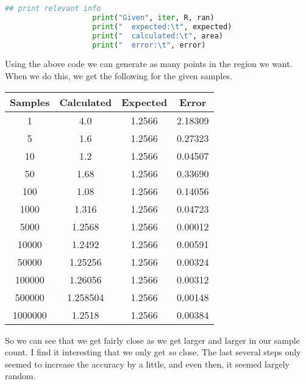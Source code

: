 \documentclass[11pt]{article}
\begin{document}
\begin{enumerate}
\begin{lstlisting}[style=mystyle, linewidth=0.94\linewidth, 
                                language=Python, gobble=12, caption=Monte Carlo
                                Rejection Sampling for Area of Circle]
                    ## print relevant info
                    print("Given", iter, R, ran)
                    print("  expected:\t", expected)
                    print("  calculated:\t", area)
                    print("  error:\t", error)
            \end{lstlisting}
            Using the above code we can generate as many points in the region
            we want. When we do this, we get the following for the given
            samples.
            \begin{center}
                \begin{tabular}{|| c || c | c | c ||}
                    \hline
                    Samples &   Calculated  &   Expected    &   Error   \\
                    \hline
                    \hline
                    1 	    &	 4.0 	    &	 1.2566 	&	 2.18309    \\
                    5 	    &	 1.6 	    &	 1.2566 	&	 0.27323    \\
                    10 	    &	 1.2 	    &	 1.2566 	&	 0.04507    \\
                    50 	    &	 1.68 	    &	 1.2566 	&	 0.33690    \\
                    100 	&	 1.08 	    &	 1.2566 	&	 0.14056    \\
                    1000 	&	 1.316 	    &	 1.2566 	&	 0.04723    \\
                    5000 	&	 1.2568 	&	 1.2566 	&	 0.00012    \\
                    10000 	&	 1.2492 	&	 1.2566 	&	 0.00591    \\
                    50000 	&	 1.25256 	&	 1.2566 	&	 0.00324    \\
                    100000 	&	 1.26056 	&	 1.2566 	&	 0.00312    \\
                    500000 	&	 1.258504 	&	 1.2566 	&	 0.00148    \\
                    1000000 &	 1.2518 	&	 1.2566 	&    0.00384    \\
                    \hline
                \end{tabular}
            \end{center}
            So we can see that we get fairly close as we get larger and larger
            in our sample count. I find it interesting that we only get
            \textit{so} close. The last several steps only seemed to increase
            the accuracy by a little, and even then, it seemed largely random.


\end{enumerate}
\end{document}
